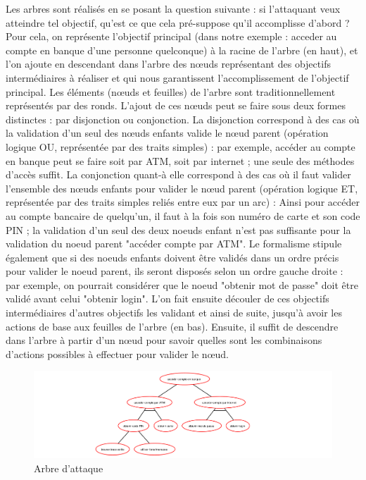         Les arbres sont réalisés en se posant la question suivante : si l'attaquant veux atteindre tel objectif, qu'est ce que cela pré-suppose qu'il accomplisse d'abord ? Pour cela, on représente l'objectif principal (dans notre exemple : acceder au compte en banque d'une personne quelconque) à la racine de l'arbre (en haut), et l'on ajoute en descendant dans l'arbre des nœuds représentant des objectifs intermédiaires à réaliser et qui nous garantissent l'accomplissement de l'objectif principal. Les éléments (nœuds et feuilles) de l'arbre sont traditionnellement représentés par des ronds. L'ajout de ces nœuds peut se faire sous deux formes distinctes : par disjonction ou conjonction. La disjonction correspond à des cas où la validation d'un seul des nœuds enfants valide le nœud parent (opération logique OU, représentée par des traits simples) : par exemple, accéder au compte en banque peut se faire soit par ATM, soit par internet ; une seule des méthodes d'accès suffit. La conjonction quant-à elle correspond à des cas où il faut valider l'ensemble des nœuds enfants pour valider le nœud parent (opération logique ET, représentée par des traits simples reliés entre eux par un arc) : Ainsi pour accéder au compte bancaire de quelqu'un, il faut à la fois son numéro de carte et son code PIN ; la validation d'un seul des deux noeuds enfant n'est pas suffisante pour la validation du noeud parent "accéder compte par ATM". Le formalisme stipule également que si des noeuds enfants doivent être validés dans un ordre précis pour valider le noeud parent, ils seront disposés selon un ordre gauche droite : par exemple, on pourrait considérer que le noeud "obtenir mot de passe" doit être validé avant celui "obtenir login". L'on fait ensuite découler de ces objectifs intermédiaires d'autres objectifs les validant et ainsi de suite, jusqu'à avoir les actions de base aux feuilles de l'arbre (en bas). Ensuite, il suffit de descendre dans l'arbre à partir d'un nœud pour savoir quelles sont les combinaisons d'actions possibles à effectuer pour valider le nœud.

        \begin{figure}[htbp]
        \centering
        \includegraphics[width=\textwidth]{figure/exemple1_rapport.pdf}%
        \caption{Arbre d'attaque}
        \label{fig:arbre_exemple_1}
        \end{figure}


